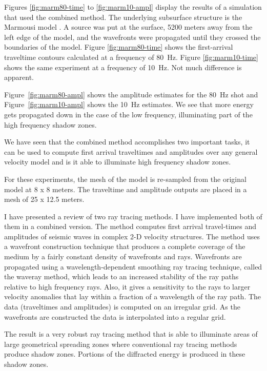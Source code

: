 
Figures \ref{fig:marm80-time} to \ref{fig:marm10-ampl} display 
the results of a simulation that used the combined 
method. The underlying subsurface structure is the 
Marmousi model \cite{Versteeg}.
A source was put at the surface, 5200 meters away from the left edge
of the model, and the wavefronts were
propagated until they crossed the boundaries of the model.
Figure \ref{fig:marm80-time}
shows the first-arrival traveltime contours calculated at a frequency
of 80~Hz. Figure \ref{fig:marm10-time} shows the same experiment at
a frequency of 10~Hz. Not much difference is apparent.

Figure~\ref{fig:marm80-ampl} shows the amplitude estimates for the 80~Hz
shot and Figure~\ref{fig:marm10-ampl} shows the 10~Hz estimates. We see
that more energy gets propagated down in the case of the low
frequency, illuminating part of the high frequency shadow zones.

We have seen that the combined method accomplishes two important tasks,
it can be used to compute first arrival traveltimes and amplitudes 
over any general velocity model and is it able to illuminate high
frequency shadow zones.

For these experiments, the mesh of the model is re-sampled
from the original model at 8 x 8 meters. The traveltime
and amplitude outputs are placed in a mesh of 25 x 12.5 meters.

\CON

I have presented a review of two ray tracing methods. I have 
implemented both of them in a combined version. The method 
computes first arrival travel-times and amplitudes of seismic 
waves in complex \mbox{2-D} velocity structures. 
The method uses a wavefront construction technique that produces
a complete coverage of the medium by a fairly
constant density of wavefronts and rays. Wavefronts are 
propagated using a wavelength-dependent smoothing ray tracing
technique, called the waveray method, which leads to an increased 
stability of the ray paths
relative to high frequency rays. Also, it gives a sensitivity to
the rays to larger velocity anomalies that lay within a fraction
of a wavelength of the ray path. The data (traveltimes and amplitudes)
is computed on an irregular grid. As the wavefronts are constructed 
the data is interpolated into a regular grid.

The result is a very robust ray tracing method that is able to 
illuminate areas of large geometrical spreading zones where
conventional ray tracing methods produce shadow zones. Portions
of the diffracted energy is produced in these shadow zones.

